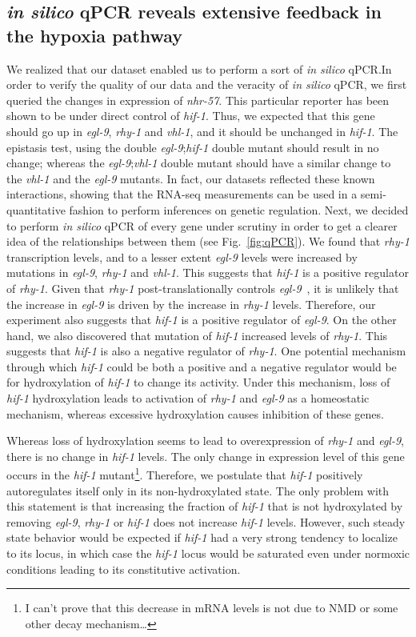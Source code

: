 \documentclass[9pt,twocolumn,twoside]{pnas-new}
\newcommand{\egl}{\emph{egl-9}}
\newcommand{\rhy}{\emph{rhy-1}}
\newcommand{\vhl}{\emph{vhl-1}}
\newcommand{\hif}{\emph{hif-1}}
\newcommand{\nhr}{\emph{nhr-57}}
\begin{document}
\subsection{\emph{in silico} qPCR reveals extensive feedback in the hypoxia pathway}
\label{sub:qPCR}
We realized that our dataset enabled us to perform a sort of \emph{in silico} qPCR.\@ In order to verify the quality of our data and the veracity of \emph{in silico} qPCR, we first queried the changes in expression of \nhr{}. This particular reporter has been shown to be under direct control of \hif{}. Thus, we expected that this gene should go up in \egl{}, \rhy{} and \vhl{}, and it should be unchanged in \hif{}. The epistasis test, using the double \egl{};\hif{} double mutant should result in no change; whereas the \egl{};\vhl{} double mutant should have a similar change to the \vhl{} and the \egl{} mutants. In fact, our datasets reflected these known interactions, showing that the RNA-seq measurements can be used in a semi-quantitative fashion to perform inferences on genetic regulation.
Next, we decided to perform \emph{in silico} qPCR of every gene under scrutiny in order to get a clearer idea of the relationships between them (see Fig.~\ref{fig:qPCR}). We found that \rhy{} transcription levels, and to a lesser extent \egl{} levels were increased by mutations in \egl{}, \rhy{} and \vhl{}. This suggests that \hif{} is a positive regulator of \rhy{}.
Given that \rhy{} post-translationally controls \egl{}~\cite{}, it is unlikely that the increase in \egl{} is driven by the increase in \rhy{} levels. Therefore, our experiment also suggests that \hif{} is a positive regulator of \egl{}. On the other hand, we also discovered that mutation of \hif{} increased levels of \rhy{}. This suggests that \hif{} is also a negative regulator of \rhy{}. One potential mechanism through which \hif{} could be both a positive and a negative regulator would be for hydroxylation of \hif{} to change its activity. Under this mechanism, loss of \hif{} hydroxylation leads to activation of \rhy{} and \egl{} as a homeostatic mechanism, whereas excessive hydroxylation causes inhibition of these genes.

Whereas loss of hydroxylation seems to lead to overexpression of \rhy{} and \egl{}, there is no change in \hif{} levels. The only change in expression level of this gene occurs in the \hif{} mutant\footnote{I can't prove that this decrease in mRNA levels is not due to NMD or some other decay mechanism\ldots{}}. Therefore, we postulate that \hif{} positively autoregulates itself only in its non-hydroxylated state. The only problem with this statement is that increasing the fraction of \hif{} that is not hydroxylated by removing \egl{}, \rhy{} or \hif{} does not increase \hif{} levels. However, such steady state behavior would be expected if \hif{} had a very strong tendency to localize to its locus, in which case the \hif{} locus would be saturated even under normoxic conditions leading to its constitutive activation.
\end{document}
